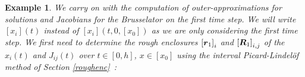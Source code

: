 \documentclass{sig-alternate-05-2015} %
\newcommand\ForAuthors[1]%
 {\par\smallskip                     %
  \begin{center}%
   \fbox%
   {\parbox{0.9\linewidth}%
    {\raggedright\sc--- #1}%
   }%
  \end{center}%
  \par\smallskip                     %
 }
\newtheorem{example}{Example}
\def\intvl#1{\mbox{$[ #1 ]$}}
\begin{document}
\begin{example}
\label{running2}
We carry on with the computation of outer-approximations for solutions and Jacobians for 
the Brusselator on the first time
step.
We will write $\intvl{x_i}(t)$ instead of $\intvl{x_i}(t,0,\intvl{x_0})$ as
we are only considering the first time step. 
We first need to determine the rough enclosures
$\intvl{\r_1}_i$ and $\intvl{\bfm{R}_1}_{i,j}$ of the $x_i(t)$ and $J_{ij}(t)$ over $t\in [0,h]$, 
$x \in \intvl{x_0}$ %
using the interval Picard-Lindel\"of method of Section \ref{roughenc}~: 

\end{example}
\end{document}
